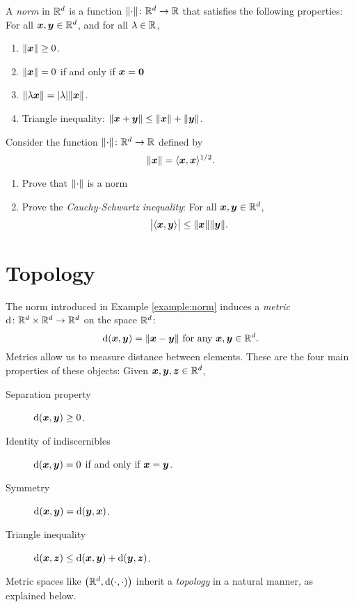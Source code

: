\begin{example}[Norms]\label{example:norm}
A \emph{norm} in $\mathbb{R}^d$ is a function $\lVert \cdot \rVert \colon \mathbb{R}^d \to \mathbb{R}$ that satisfies the following properties:
For all $\boldsymbol{x}, \boldsymbol{y} \in \mathbb{R}^d$, and for all $\lambda \in \mathbb{R}$,
\begin{enumerate}
	\item $\lVert \boldsymbol{x} \rVert \geq 0$.
	\item $\lVert \boldsymbol{x} \rVert = 0$ if and only if $\boldsymbol{x} = \boldsymbol{0}$
	\item $\lVert  \lambda \boldsymbol{x} \rVert = \lvert \lambda \rvert \lVert \boldsymbol{x} \rVert$.
	\item Triangle inequality: $\lVert \boldsymbol{x} + \boldsymbol{y} \rVert \leq \lVert \boldsymbol{x} \rVert + \lVert \boldsymbol{y} \rVert$.
\end{enumerate}
\end{example}

\begin{problem}\label{problem:norm}
Consider the function $\lVert \cdot \rVert \colon \mathbb{R}^d \to \mathbb{R}$ defined by 
\begin{equation*}
\lVert \boldsymbol{x} \rVert = \langle \boldsymbol{x}, \boldsymbol{x} \rangle^{1/2}.
\end{equation*}
\begin{enumerate}
	\item Prove that $\lVert \cdot \rVert$ is a norm
	\item Prove the \emph{Cauchy-Schwartz inequality}: For all $\boldsymbol{x}, \boldsymbol{y} \in \mathbb{R}^d$, 
	\begin{equation*}
	\big\lvert \langle \boldsymbol{x}, \boldsymbol{y} \rangle \big\rvert \leq \lVert \boldsymbol{x} \rVert \lVert \boldsymbol{y} \rVert.
	\end{equation*}
\end{enumerate}
\end{problem}


\section{Topology}
The norm introduced in Example \ref{example:norm} induces a \emph{metric} $\operatorname{d} \colon \mathbb{R}^d \times \mathbb{R}^d \to \mathbb{R}^d$ on the space $\mathbb{R}^d$: 
\begin{equation*}
\operatorname{d}(\boldsymbol{x},\boldsymbol{y}) = \lVert \boldsymbol{x} - \boldsymbol{y} \rVert \text{ for any }\boldsymbol{x}, \boldsymbol{y} \in \mathbb{R}^d.
\end{equation*}
Metrics allow us to measure distance between elements.  These are the four main properties of these objects:  Given $\boldsymbol{x}, \boldsymbol{y}, \boldsymbol{z} \in \mathbb{R}^d$,
\begin{description}
	\item[Separation property] $\operatorname{d}(\boldsymbol{x},\boldsymbol{y}) \geq 0$.
	\item[Identity of indiscernibles] $\operatorname{d}(\boldsymbol{x}, \boldsymbol{y}) = 0$ if and only if $\boldsymbol{x} = \boldsymbol{y}$.
	\item[Symmetry] $\operatorname{d}(\boldsymbol{x}, \boldsymbol{y}) = \operatorname{d}(\boldsymbol{y}, \boldsymbol{x})$.
	\item[Triangle inequality] $\operatorname{d}(\boldsymbol{x},\boldsymbol{z}) \leq \operatorname{d}(\boldsymbol{x},\boldsymbol{y}) + \operatorname{d}(\boldsymbol{y},\boldsymbol{z})$. 
\end{description}
Metric spaces like $\big( \mathbb{R}^d, \operatorname{d}(\cdot,\cdot) \big)$ inherit a \emph{topology} in a natural manner, as explained below.

